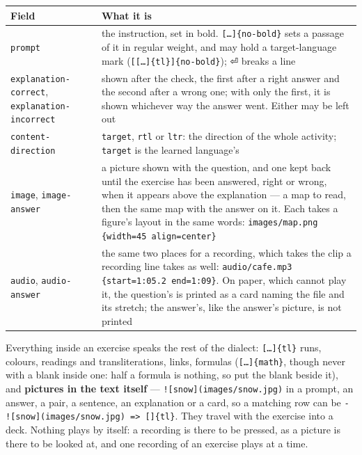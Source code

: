 \documentclass[11pt,oneside]{report}
\newcommand{\pw}[1]{\babelsublr{\mbox{\foreignlanguage{persian}{#1}}}}
\newcommand{\sym}[1]{{\symfont #1}}
\begin{document}
\begin{center}
\small
\begin{longtable}{@{}>{\raggedright\arraybackslash}p{}>{\raggedright\arraybackslash}p{}@{}}
\toprule
\textsf{Field} & \textsf{What it is} \\
\midrule
\texttt{prompt} & the instruction, set in bold. \texttt{[\ldots]\{no-bold\}}
  sets a passage of it in regular weight, and may hold a target-language mark
  (\texttt{[[\ldots]\{tl\}]\{no-bold\}}); \sym{⏎} breaks a line \\
\addlinespace
\texttt{explanation-correct}, \texttt{explanation-incorrect} & shown after
  the check, the first after a right answer and the second after a wrong one;
  with only the first, it is shown whichever way the answer went. Either may
  be left out \\
\addlinespace
\texttt{content-direction} & \texttt{target}, \texttt{rtl} or \texttt{ltr}:
  the direction of the whole activity; \texttt{target} is the learned
  language's \\
\addlinespace
\texttt{image}, \texttt{image-answer} & a picture shown with the question,
  and one kept back until the exercise has been answered, right or wrong, when
  it appears above the explanation --- a map to read, then the same map with
  the answer on it. Each takes a figure's layout in the same words:
  \texttt{images/map.png \{width=45 align=center\}} \\
\addlinespace
\texttt{audio}, \texttt{audio-answer} & the same two places for a
  recording, which takes the clip a recording line takes as well:
  \texttt{audio/cafe.mp3 \{start=1:05.2 end=1:09\}}. On paper, which cannot
  play it, the question's is printed as a card naming the file and its
  stretch; the answer's, like the answer's picture, is not printed \\
\bottomrule
\end{longtable}
\end{center}

\noindent Everything inside an exercise speaks the rest of the dialect:
\texttt{[\ldots]\{tl\}} runs, colours, readings and transliterations, links,
formulas (\texttt{[\ldots]\{math\}}, though never with a blank inside one:
half a formula is nothing, so put the blank beside it), and \textbf{pictures
in the text itself} --- \texttt{![snow](images/snow.jpg)} in a prompt, an
answer, a pair, a sentence, an explanation or a card, so a matching row can
be \texttt{- ![snow](images/snow.jpg) => [}\pw{برف}\texttt{]\{tl\}}. They
travel with the exercise into a deck. Nothing plays by itself: a recording
is there to be pressed, as a picture is there to be looked at, and one
recording of an exercise plays at a time.
\end{document}
